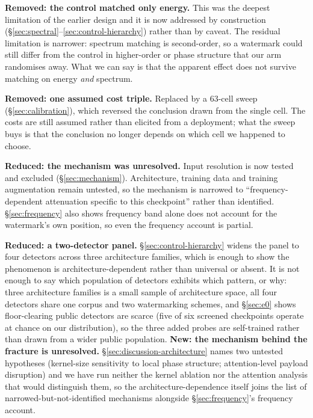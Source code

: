 \documentclass[journal]{IEEEtran}
\begin{document}
\textbf{Removed: the control matched only energy.} This was the deepest
limitation of the earlier design and it is now addressed by construction
(\S\ref{sec:spectral}--\ref{sec:control-hierarchy}) rather than by caveat. The
residual limitation is narrower: spectrum matching is second-order, so a
watermark could still differ from the control in higher-order or phase
structure that our arm randomises away. What we can say is that the apparent
effect does not survive matching on energy \emph{and} spectrum.

\textbf{Removed: one assumed cost triple.} Replaced by a $63$-cell sweep
(\S\ref{sec:calibration}), which reversed the conclusion drawn from the single
cell. The costs are still assumed rather than elicited from a deployment; what
the sweep buys is that the conclusion no longer depends on which cell we
happened to choose.

\textbf{Reduced: the mechanism was unresolved.} Input resolution is now tested
and excluded (\S\ref{sec:mechanism}). Architecture, training data and training
augmentation remain untested, so the mechanism is narrowed to
``frequency-dependent attenuation specific to this checkpoint'' rather than
identified. \S\ref{sec:frequency} also shows frequency band alone does not
account for the watermark's own position, so even the frequency account is
partial.

\textbf{Reduced: a two-detector panel.} \S\ref{sec:control-hierarchy} widens
the panel to four detectors across three architecture families, which is
enough to show the phenomenon is architecture-dependent rather than universal
or absent. It is not enough to say which population of detectors exhibits
which pattern, or why: three architecture families is a small sample of
architecture space, all four detectors share one corpus and two watermarking
schemes, and \S\ref{sec:e0} shows floor-clearing public detectors are scarce
(five of six screened checkpoints operate at chance on our distribution), so
the three added probes are self-trained rather than drawn from a wider public
population. \textbf{New: the mechanism behind the fracture is unresolved.}
\S\ref{sec:discussion-architecture} names two untested hypotheses (kernel-size
sensitivity to local phase structure; attention-level payload disruption) and
we have run neither the kernel ablation nor the attention analysis that would
distinguish them, so the architecture-dependence itself joins the list of
narrowed-but-not-identified mechanisms alongside \S\ref{sec:frequency}'s
frequency account.
\end{document}
